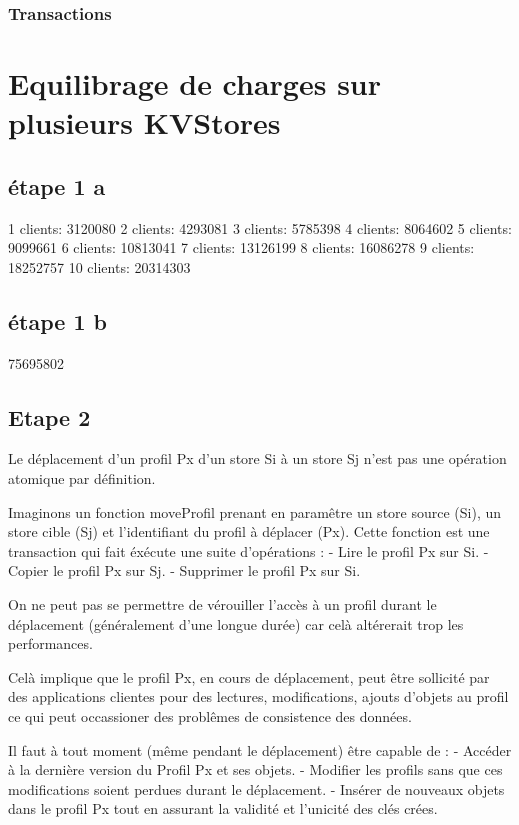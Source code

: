 \documentclass[a4paper,11pt]{article}
\begin{document}
\subsubsection*{Transactions}


\section*{Equilibrage de charges sur plusieurs KVStores}

\subsection*{étape 1 a}
1 clients: 3120080
2 clients: 4293081
3 clients: 5785398
4 clients: 8064602
5 clients: 9099661
6 clients: 10813041
7 clients: 13126199
8 clients: 16086278
9 clients: 18252757
10 clients: 20314303

\subsection*{étape 1 b}
75695802

\subsection*{Etape 2}
Le déplacement d'un profil Px d'un store Si à un store Sj n'est pas une opération atomique par définition. 

Imaginons un fonction moveProfil prenant en paramêtre un store source (Si), un store cible (Sj) et l'identifiant du profil à déplacer (Px). Cette fonction est une transaction qui fait éxécute une suite d'opérations :
- Lire le profil Px sur Si.
- Copier le profil Px sur Sj.
- Supprimer le profil Px sur Si.

On ne peut pas se permettre de vérouiller l'accès à un profil durant le déplacement (généralement d'une longue durée) car celà altérerait trop les performances.

Celà implique que le profil Px, en cours de déplacement, peut être sollicité par des applications clientes pour des lectures, modifications, ajouts d'objets au profil ce qui peut occassioner des problêmes de consistence des données.
 
Il faut à tout moment (même pendant le déplacement) être capable de :
- Accéder à la dernière version du Profil Px et ses objets.
- Modifier les profils sans que ces modifications soient perdues durant le déplacement.
- Insérer de nouveaux objets dans le profil Px tout en assurant la validité et l'unicité des clés crées.
\end{document}
